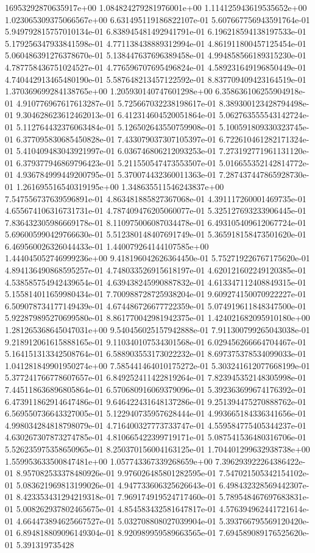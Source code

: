 16953292870635917e+00	1.084824279281976001e+00	1.114125943619535652e+00	1.023065309375066567e+00	6.631495119186822107e-01	5.607667756943591764e-01	5.949792815757010134e-01	6.838945481492941791e-01	6.196218594138197533e-01	5.179256347933841598e-01	4.771138438889312994e-01	4.861911800457125454e-01	5.060486391276378670e-01	5.138447637696389458e-01	4.994858566189315230e-01	4.787758436751024527e-01	4.776596707695496824e-01	4.589231649196850449e-01	4.740442913465480190e-01	5.587648213457122592e-01	8.837709409423164519e-01	1.370369699284138765e+00	1.205930140747601298e+00	6.358636106255904918e-01	4.910776967617613287e-01	5.725667032238198617e-01	8.389300123428794498e-01	9.304628623612462013e-01	6.412314604520051864e-01	5.062763555543142724e-01	5.112764432376063484e-01	5.126502643550759908e-01	5.100591809330323745e-01	6.377095830685450828e-01	7.433079037307105397e-01	6.722610461282171324e-01	5.410409483043921997e-01	6.036746806212093253e-01	7.273192771961131120e-01	6.379377946869796423e-01	5.211550547473553507e-01	5.016655352142814772e-01	4.936784999449200795e-01	5.370074432360011363e-01	7.287437447865928730e-01	1.261695516540319195e+00	1.348635511546243837e+00	7.547556737639596891e-01	4.863481885827367068e-01	4.391117260001469735e-01	4.655674106316731731e-01	4.787409476205060077e-01	5.325127693233906445e-01	7.836432305986669178e-01	8.110975006087034478e-01	6.493105409612067724e-01	5.696005990429766630e-01	5.512380148407691749e-01	5.365918158473501620e-01	6.469560026326044433e-01	1.440079264144107585e+00	1.444045052746999236e+00	9.418196042626364450e-01	5.752719226767175620e-01	4.894136490868595257e-01	4.748033526915618197e-01	4.620121602249120385e-01	4.538585754942439654e-01	4.639438245990887832e-01	4.613347112408849315e-01	5.155814011659980434e-01	7.700988728725938204e-01	9.609274150070922227e-01	6.509078734177149439e-01	4.674486726677722359e-01	5.074919611848347500e-01	5.922879895270699580e-01	8.861770042981942375e-01	1.424021682095910180e+00	1.281265368645047031e+00	9.540456025157942888e-01	7.911300799265043038e-01	9.218912061615888165e-01	9.110340107534301568e-01	6.029456266664704467e-01	5.164151313342508764e-01	6.588903553173022232e-01	8.697375378534099033e-01	1.041281849901950274e+00	7.585441464010175272e-01	5.303241612077668199e-01	5.377241766778607657e-01	6.849252411422819264e-01	7.823945352148305998e-01	7.445118636896805864e-01	6.570680916069379096e-01	5.392363699674176392e-01	6.473911862914647486e-01	9.646422431648137286e-01	9.251394475270888762e-01	6.569550736643327005e-01	5.122940735957628444e-01	4.993665184336341656e-01	4.998034284818798079e-01	4.716400327773733747e-01	4.559584775405344237e-01	4.630267307873274785e-01	4.810665422399719171e-01	5.087541536480316706e-01	5.526235975358650965e-01	8.250370156004163125e-01	1.704401299632938738e+00	1.559953633500847481e+00	1.057743367339268659e+00	7.396293922264386422e-01	8.957082533378480926e-01	9.976026485801282595e-01	7.547021505342154102e-01	5.083621969813199026e-01	4.947733606325626643e-01	6.498432328569442307e-01	8.423353431294219318e-01	7.969174919524717460e-01	5.789548467697683831e-01	5.008262937802465675e-01	4.854583432581647817e-01	4.576394962441721614e-01	4.664473894625667527e-01	5.032708808027039904e-01	5.393766795569120420e-01	6.894818809096149304e-01	8.920989959589663565e-01	7.694589089176525620e-01	5.391319735428